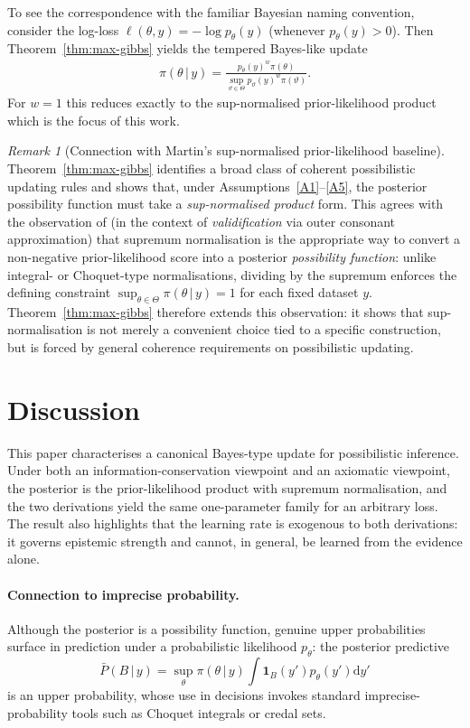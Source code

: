 \documentclass[accepted]{uai2026} %
\def\given{\,|\,}
\theoremstyle{remark}
\newtheorem{remark}{Remark}
\begin{document}
To see the correspondence with the familiar Bayesian naming convention, consider the log-loss $\ell(\theta,y) = -\log p_{\theta}(y)$ (whenever $p_\theta(y)>0$). Then Theorem~\ref{thm:max-gibbs} yields the tempered Bayes-like update
\begin{align}
    \pi(\theta\given y) = \frac{p_\theta(y)^{w} \pi(\theta)}{\sup_{\vartheta\in\Theta} p_\vartheta(y)^{w} \pi(\vartheta)}.
\end{align}
For $w=1$ this reduces exactly to the sup-normalised prior-likelihood product which is the focus of this work.

\begin{remark}[Connection with Martin's sup-normalised prior-likelihood baseline]
\label{rem:martin-connection}
Theorem~\ref{thm:max-gibbs} identifies a broad class of coherent possibilistic updating rules and shows that, under Assumptions~\ref{A1}--\ref{A5}, the posterior possibility function must take a \emph{sup-normalised product} form. This agrees with the observation of \citet{martin2022valid} (in the context of \emph{validification} via outer consonant approximation) that supremum normalisation is the appropriate way to convert a non-negative prior-likelihood score into a posterior \emph{possibility function}: unlike integral- or Choquet-type normalisations, dividing by the supremum enforces the defining constraint $\sup_{\theta\in\Theta}\pi(\theta\given y)=1$ for each fixed dataset $y$. Theorem~\ref{thm:max-gibbs} therefore extends this observation: it shows that sup-normalisation is not merely a convenient choice tied to a specific construction, but is forced by general coherence requirements on possibilistic updating.
\end{remark}


\section{Discussion}

This paper characterises a canonical Bayes-type update for possibilistic inference. Under both an information-conservation viewpoint and an axiomatic viewpoint, the posterior is the prior-likelihood product with supremum normalisation, and the two derivations yield the same one-parameter family for an arbitrary loss. The result also highlights that the learning rate is exogenous to both derivations: it governs epistemic strength and cannot, in general, be learned from the evidence alone.

\paragraph{Connection to imprecise probability.} Although the posterior is a possibility function, genuine upper probabilities surface in prediction under a probabilistic likelihood $p_\theta$: the posterior predictive
\[
\bar{P}(B \given y) = \sup_{\theta} \pi(\theta\given y) \int \bm{1}_B(y') p_{\theta}(y') \mathrm{d}y'
\]
is an upper probability, whose use in decisions invokes standard imprecise-probability tools such as Choquet integrals or credal sets.
\end{document}
